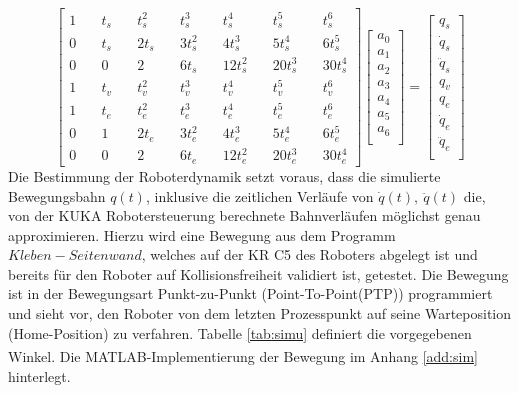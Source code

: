 \begin{equation}
	\label{eqn:lgs}
	\left[	\begin{matrix}
		1&\quad    t_s&\quad          	t_s^2&\quad              	t_s^3&\quad         	t_s^4&\quad              	t_s^5&\quad          	t_s^6\\
		0&\quad    t_s&\quad          	2t_s&\quad              	3t_s^2&\quad        	4t_s^3&\quad            	5t_s^4&\quad        	6t_s^5\\
		0&\quad    0&\quad         		2&\quad              	  	6t_s&\quad         	 	12t_s^2&\quad           	20t_s^3&\quad       	30t_s^4\\
		1&\quad    t_v&\quad         	t_v^2&\quad              	t_v^3&\quad         	t_v^4&\quad             	t_v^5&\quad          	t_v^6\\
		1&\quad    t_e&\quad        	t_e^2&\quad              	t_e^3&\quad          	t_e^4&\quad             	t_e^5&\quad          	t_e^6\\
		0&\quad    1&\quad   	   		2t_e&\quad              	3t_e^2&\quad        	4t_e^3&\quad           		5t_e^4&\quad        	6t_e^5\\   
		0&\quad    0&\quad          	2&\quad                 	6t_e&\quad          	12t_e^2&\quad           	20t_e^3&\quad       	30t_e^4
	\end{matrix}\right]
	\left[	\begin{matrix}
		a_0\\
		a_1\\
		a_2\\
		a_3\\
		a_4\\
		a_5\\
		a_6\\		
	\end{matrix}\right] = 
		\left[	\begin{matrix}
		q_s\\
		\dot{q}_s\\
		\ddot{q}_s\\
		q_v\\
		q_e\\
		\dot{q}_e\\
		\ddot{q}_e\\		
	\end{matrix}\right]
\end{equation}
%
Die Bestimmung der Roboterdynamik setzt voraus, dass die simulierte Bewegungsbahn $q(t)$, inklusive die zeitlichen Verläufe von $\dot{q}(t), ~\ddot{q}(t)$  die, von der KUKA Robotersteuerung berechnete Bahnverläufen möglichst genau approximieren. Hierzu wird eine Bewegung aus dem Programm $Kleben-Seitenwand$, welches auf der KR C5 des Roboters abgelegt ist und bereits für den Roboter auf Kollisionsfreiheit validiert ist, getestet. Die Bewegung ist in der Bewegungsart  Punkt-zu-Punkt (Point-To-Point(PTP)) programmiert und sieht vor, den Roboter von dem letzten Prozesspunkt auf seine Warteposition (Home-Position) zu verfahren. Tabelle \ref{tab:simu} definiert die vorgegebenen Winkel. Die MATLAB\textsuperscript{\textregistered}-Implementierung der Bewegung im Anhang \ref{add:sim} hinterlegt.
